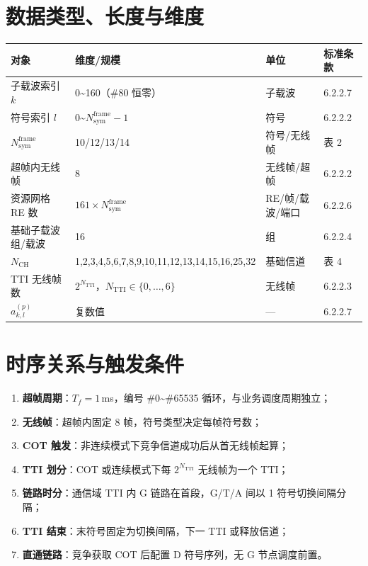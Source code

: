 \documentclass[11pt,a4paper]{ctexart}
\begin{document}
\section{数据类型、长度与维度}

\begin{table}[h]
\centering
\small
\begin{tabular}{llll}
\toprule
\textbf{对象} & \textbf{维度/规模} & \textbf{单位} & \textbf{标准条款} \\
\midrule
子载波索引 $k$ & 0\textasciitilde 160（\#80 恒零） & 子载波 & 6.2.2.7 \\
符号索引 $l$ & 0\textasciitilde $N_{\mathrm{sym}}^{\mathrm{frame}}{-}1$ & 符号 & 6.2.2.2 \\
$N_{\mathrm{sym}}^{\mathrm{frame}}$ & 10/12/13/14 & 符号/无线帧 & 表 2 \\
超帧内无线帧 & 8 & 无线帧/超帧 & 6.2.2.2 \\
资源网格 RE 数 & $161 \times N_{\mathrm{sym}}^{\mathrm{frame}}$ & RE/帧/载波/端口 & 6.2.2.6 \\
基础子载波组/载波 & 16 & 组 & 6.2.2.4 \\
$N_{\mathrm{CH}}$ & 1,2,3,4,5,6,7,8,9,10,11,12,13,14,15,16,25,32 & 基础信道 & 表 4 \\
TTI 无线帧数 & $2^{N_{\mathrm{TTI}}}$，$N_{\mathrm{TTI}}\in\{0,\ldots,6\}$ & 无线帧 & 6.2.2.3 \\
$a_{k,l}^{(p)}$ & 复数值 & --- & 6.2.2.7 \\
\bottomrule
\end{tabular}
\end{table}

\section{时序关系与触发条件}

\begin{enumerate}[nosep]
  \item \textbf{超帧周期}：$T_f = 1$\,ms，编号 \#0\textasciitilde\#65535 循环，与业务调度周期独立；
  \item \textbf{无线帧}：超帧内固定 8 帧，符号类型决定每帧符号数；
  \item \textbf{COT 触发}：非连续模式下竞争信道成功后从首无线帧起算；
  \item \textbf{TTI 划分}：COT 或连续模式下每 $2^{N_{\mathrm{TTI}}}$ 无线帧为一个 TTI；
  \item \textbf{链路时分}：通信域 TTI 内 G 链路在首段，G/T/A 间以 1 符号切换间隔分隔；
  \item \textbf{TTI 结束}：末符号固定为切换间隔，下一 TTI 或释放信道；
  \item \textbf{直通链路}：竞争获取 COT 后配置 D 符号序列，无 G 节点调度前置。
\end{enumerate}
\end{document}
